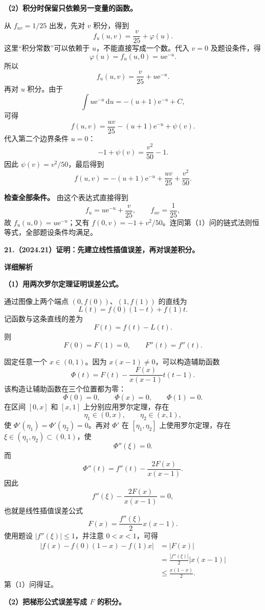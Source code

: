 \documentclass[UTF8,11pt,fontset=windows]{ctexart}
\begin{document}
\textbf{（2）积分时保留只依赖另一变量的函数。}

从 $f_{uv}=1/25$ 出发，先对 $v$ 积分，得到
$$
f_u(u,v)=\frac v{25}+\varphi(u).
$$
这里“积分常数”可以依赖于 $u$，不能直接写成一个数。代入 $v=0$ 及题设条件，得
$$
\varphi(u)=f_u(u,0)=u\mathrm e^{-u}.
$$
所以
$$
f_u(u,v)=\frac v{25}+u\mathrm e^{-u}.
$$
再对 $u$ 积分。由于
$$
\int u\mathrm e^{-u}\,\mathrm du
=-(u+1)\mathrm e^{-u}+C,
$$
可得
$$
f(u,v)=\frac{uv}{25}-(u+1)\mathrm e^{-u}+\psi(v).
$$
代入第二个边界条件 $u=0$：
$$
-1+\psi(v)=\frac{v^2}{50}-1.
$$
因此 $\psi(v)=v^2/50$，最后得到
$$
\boxed{f(u,v)=-(u+1)\mathrm e^{-u}
+\frac{uv}{25}+\frac{v^2}{50}}.
$$

\textbf{检查全部条件。} 由这个表达式直接得到
$$
f_u=u\mathrm e^{-u}+\frac v{25},\qquad
f_{uv}=\frac1{25},
$$
故 $f_u(u,0)=u\mathrm e^{-u}$；又有 $f(0,v)=-1+v^2/50$。连同第（1）问的链式法则恒等式，全部题设条件均满足。

\clearpage

\textbf{21.（2024.21）证明：先建立线性插值误差，再对误差积分。}

\textbf{详细解析}

\textbf{（1）用两次罗尔定理证明误差公式。}

通过图像上两个端点 $(0,f(0))$、$(1,f(1))$ 的直线为
$$
L(t)=f(0)(1-t)+f(1)t.
$$
记函数与这条直线的差为
$$
F(t)=f(t)-L(t).
$$
则
$$
F(0)=F(1)=0,\qquad F''(t)=f''(t).
$$

固定任意一个 $x\in(0,1)$。因为 $x(x-1)\ne0$，可以构造辅助函数
$$
\Phi(t)=F(t)-\frac{F(x)}{x(x-1)}t(t-1).
$$
该构造让辅助函数在三个位置都为零：
$$
\Phi(0)=0,\qquad\Phi(x)=0,\qquad\Phi(1)=0.
$$
在区间 $[0,x]$ 和 $[x,1]$ 上分别应用罗尔定理，存在
$$
\eta_1\in(0,x),\qquad \eta_2\in(x,1),
$$
使 $\Phi'(\eta_1)=\Phi'(\eta_2)=0$。再对 $\Phi'$ 在 $[\eta_1,\eta_2]$ 上使用罗尔定理，存在 $\xi\in(\eta_1,\eta_2)\subset(0,1)$，使
$$
\Phi''(\xi)=0.
$$
而
$$
\Phi''(t)=f''(t)-\frac{2F(x)}{x(x-1)}.
$$
因此
$$
f''(\xi)-\frac{2F(x)}{x(x-1)}=0,
$$
也就是线性插值误差公式
$$
F(x)=\frac{f''(\xi)}2x(x-1).
$$
使用题设 $|f''(\xi)|\le1$，并注意 $0<x<1$，可得
$$
\begin{aligned}
|f(x)-f(0)(1-x)-f(1)x|
&=|F(x)|\\
&=\frac{|f''(\xi)|}{2}|x(x-1)|\\
&\le\frac{x(1-x)}2.
\end{aligned}
$$
第（1）问得证。

\textbf{（2）把梯形公式误差写成 $F$ 的积分。}
\end{document}

